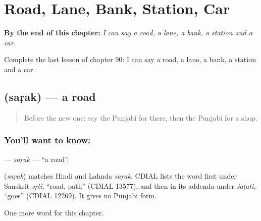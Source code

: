
\chapter{Road, Lane, Bank, Station, Car}
\label{ch:pa-road-lane-bank-station-car}

\begin{chapteropening}
\textbf{By the end of this chapter:} \emph{I can say a road, a lane, a bank, a station and a car.}

Complete the last lesson of chapter 90: I can say a road, a lane, a bank, a station and a car.
\end{chapteropening}

\section[\texorpdfstring{\pa{ਸੜਕ} (saṛak)}{ਸੜਕ (saṛak)}]{ (saṛak) — a road}

\label{lesson:PA-C90-sarak}



\begin{quote}
Before the new one: say the Punjabi for there, then the Punjabi for a shop.
\end{quote}

\subsection*{You'll want to know: }
\textbf{} — \emph{saṛak} — \textquotedblleft{}a road\textquotedblright{}.

\begin{cousinweb}
\textbf{} (\emph{saṛak}) matches Hindi and Lahnda \emph{saṛak}. CDIAL lists the word first under Sanskrit \emph{sṛti}, \textquotedblleft{}road, path\textquotedblright{} (CDIAL 13577), and then in its addenda under \emph{śaṭati}, \textquotedblleft{}goes\textquotedblright{} (CDIAL 12269). It gives no Punjabi form.
\end{cousinweb}

\begin{grammarlens}[title={What you've built}]
One more word for this chapter.
\end{grammarlens}

